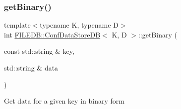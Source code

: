\subsubsection{\texorpdfstring{getBinary()}{getBinary()}\hspace{0.1cm}{\footnotesize\ttfamily [1/2]}}
{\footnotesize\ttfamily template$<$typename K, typename D$>$ \\
int \mbox{\hyperlink{classFILEDB_1_1ConfDataStoreDB}{F\+I\+L\+E\+D\+B\+::\+Conf\+Data\+Store\+DB}}$<$ K, D $>$\+::get\+Binary (\begin{DoxyParamCaption}\item[{const std\+::string \&}]{key,  }\item[{std\+::string \&}]{data }\end{DoxyParamCaption})\hspace{0.3cm}{\ttfamily [inline]}}

Get data for a given key in binary form


